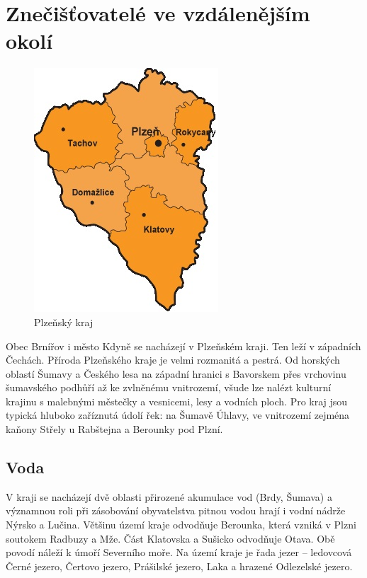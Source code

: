 \documentclass[12pt]{article} %
\begin{document}
\section{Znečišťovatelé ve vzdálenějším okolí}
\begin{figure}
	\vspace{-20pt}
	\begin{center}
		\includegraphics[scale=0.7]{plzensky_kraj.jpg}
	\end{center}
	\vspace{-10pt}
	\caption{Plzeňský kraj}
	\vspace{-20pt}
\end{figure}
Obec Brnířov i město Kdyně se nacházejí v Plzeňském kraji. Ten leží v západních Čechách. Příroda Plzeňského kraje je velmi rozmanitá a pestrá. Od horských oblastí Šumavy a Českého lesa na západní hranici s Bavorskem přes vrchovinu šumavského podhůří až ke zvlněnému vnitrozemí, všude lze nalézt kulturní krajinu s malebnými městečky a vesnicemi, lesy a vodních ploch. Pro kraj jsou typická hluboko zaříznutá údolí řek: na Šumavě Úhlavy, ve vnitrozemí zejména kaňony Střely u Rabštejna a Berounky pod Plzní.


\subsection{Voda}
V kraji se nacházejí dvě oblasti přirozené akumulace vod (Brdy, Šumava) a významnou roli při zásobování obyvatelstva pitnou vodou hrají i vodní nádrže Nýrsko a Lučina. Většinu území kraje odvodňuje Berounka, která vzniká v Plzni soutokem Radbuzy a Mže. Část Klatovska a Sušicko odvodňuje Otava. Obě povodí náleží k úmoří Severního moře. Na území kraje je řada jezer – ledovcová Černé jezero, Čertovo jezero, Prášilské jezero, Laka a hrazené Odlezelské jezero.
\end{document}
